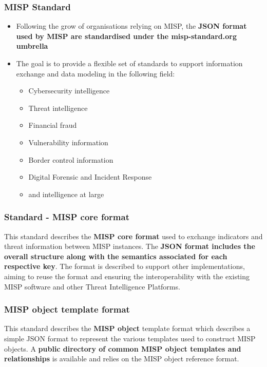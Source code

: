 
\begin{frame}[t,plain]
\titlepage
\end{frame}

\begin{frame}[fragile]
        \frametitle{MISP Standard}
\begin{itemize}
        \item Following the grow of organisations relying on MISP, the {\bf JSON format used by MISP are standardised under the misp-standard.org umbrella}
\item The goal is to provide a flexible set of standards to support information exchange and data modeling in the following field:
        \begin{itemize}
                \item Cybersecurity intelligence
                \item Threat intelligence
                \item Financial fraud
                \item Vulnerability information
                \item Border control information
                \item Digital Forensic and Incident Response
                \item and intelligence at large
        \end{itemize}
\end{itemize}
\end{frame}

\begin{frame}[fragile]
        \frametitle{Standard - MISP core format}
        This standard describes the {\bf MISP core format} used to exchange indicators and threat information between MISP instances. The {\bf JSON format includes the overall structure along with the semantics associated for each respective key}. The format is described to support other implementations, aiming to reuse the format and ensuring the interoperability with the existing MISP software and other Threat Intelligence Platforms.
\end{frame}

\begin{frame}[fragile]
        \frametitle{MISP object template format}
        This standard describes the {\bf MISP object} template format which describes a simple JSON format to represent the various templates used to construct MISP objects. A {\bf public directory of common MISP object templates and relationships} is available and relies on the MISP object reference format.
\end{frame}


